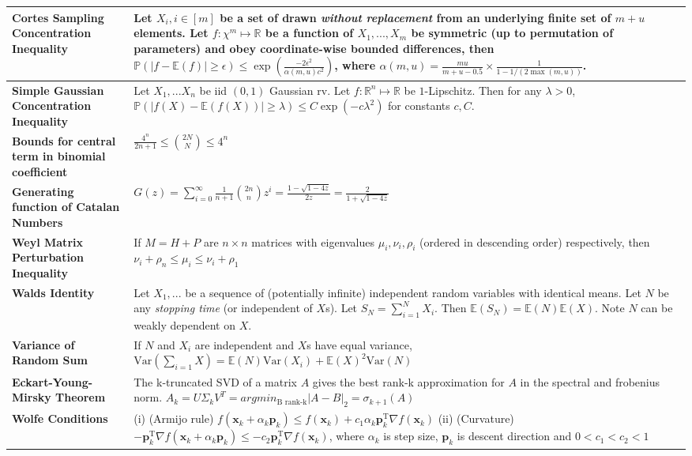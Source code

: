\documentclass[11pt]{article}
\begin{document}
\begin{longtable}{|>{\raggedright}m{4.5cm}|m{13cm}|}
\textbf{Cortes Sampling Concentration Inequality} & Let $X_i, i \in [m]$ be a set of drawn \textit{without replacement} from an underlying finite set of $m+u$ elements. Let $f: \chi^m \mapsto \mathbb{R}$ be a function of $X_1,...,X_m$ be symmetric (up to permutation of parameters) and obey coordinate-wise bounded differences, then $\mathbb{P}(|f - \mathbb{E}(f)| \geq \epsilon) \leq \exp\left(  \frac{-2\epsilon^2}{\alpha(m,u)c^2} \right)$, where $\alpha(m,u)=\frac{mu}{m+u-0.5} \times \frac{1}{1-1/(2\max(m,u))}$.\\ \hline
\textbf{Simple Gaussian Concentration Inequality} & Let $X_1,...X_n$ be iid $(0,1)$ Gaussian rv. Let $f:\mathbb{R}^n \mapsto \mathbb{R}$ be $1$-Lipschitz. Then for any $\lambda >0$, $\mathbb{P}(|f(X) - \mathbb{E}(f(X))| \geq \lambda) \leq C\exp(-c\lambda^2)$ for constants $c, C$.\\ \hline
\textbf{Bounds for central term in binomial coefficient} & $\frac{4^n}{2n+1} \leq \binom{2N}{N} \leq 4^n$\\ \hline
\textbf{Generating function of Catalan Numbers} & $G(z) = \sum_{i=0}^{\infty} \frac{1}{n+1} \binom{2n}{n} z^i = \frac{1-\sqrt{1-4z}}{2z} = \frac{2}{1+\sqrt{1-4z}}$\\ \hline
\textbf{Weyl Matrix Perturbation Inequality} & If $M=H+P$ are $n \times n$ matrices with eigenvalues $\mu_i, \nu_i, \rho_i$ (ordered in descending order) respectively, then $\nu_i + \rho_n \leq \mu_i \leq \nu_i + \rho_1$\\ \hline
\textbf{Walds Identity} & Let $X_1,...$ be a sequence of (potentially infinite) independent random variables with identical means. Let $N$ be any \textit{stopping time} (or independent of $X$s). Let $S_N=\sum_{i=1}^{N}X_i$. Then $\mathbb{E}(S_N)=\mathbb{E}(N)\mathbb{E}(X)$. Note $N$ can be weakly dependent on $X$.\\ \hline
\textbf{Variance of Random Sum} & If $N$ and $X_i$ are independent and $X$s have equal variance, $\text{Var}(\sum_{i=1}{X}) = \mathbb{E}(N)\text{Var}(X_i) + \mathbb{E}(X)^2\text{Var}(N)$\\ \hline
\textbf{Eckart-Young-Mirsky Theorem} & The k-truncated SVD of a matrix $A$ gives the best rank-k approximation for $A$ in the spectral and frobenius norm. $A_k = U\Sigma_k V^T = argmin_{\text{B rank-k}}|A-B|_2 = \sigma_{k+1}(A)$\\ \hline
\textbf{Wolfe Conditions} & (i) (Armijo rule) $ f(\mathbf{x}_k+\alpha_k\mathbf{p}_k)\leq f(\mathbf{x}_k)+c_1\alpha_k\mathbf{p}_k^{\mathrm T}\nabla f(\mathbf{x}_k) $ (ii) (Curvature) $-\mathbf{p}_k^{\mathrm T}\nabla f(\mathbf{x}_k+\alpha_k\mathbf{p}_k) \leq -c_2\mathbf{p}_k^{\mathrm T}\nabla f(\mathbf{x}_k)$, where $\alpha_k$ is step size, $\mathbf{p}_k$ is descent direction and $ 0 < c_1 < c_2 < 1 $\\ \hline
\end{longtable}
\end{document}
